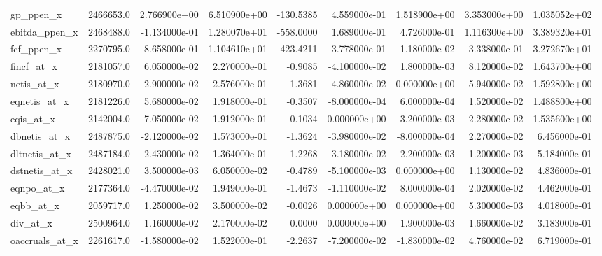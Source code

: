 \documentclass[12pt]{article}
\begin{document}
\begin{landscape}
\begin{longtable}{|l|r|r|r|r|r|r|r|r|}
gp\_ppen\_x               &  2466653.0 &  2.766900e+00 &  6.510900e+00 &   -130.5385 &  4.559000e-01 &  1.518900e+00 &  3.353000e+00 &  1.035052e+02 \\
ebitda\_ppen\_x           &  2468488.0 & -1.134000e-01 &  1.280070e+01 &   -558.0000 &  1.689000e-01 &  4.726000e-01 &  1.116300e+00 &  3.389320e+01 \\
fcf\_ppen\_x              &  2270795.0 & -8.658000e-01 &  1.104610e+01 &   -423.4211 & -3.778000e-01 & -1.180000e-02 &  3.338000e-01 &  3.272670e+01 \\
fincf\_at\_x              &  2181057.0 &  6.050000e-02 &  2.270000e-01 &     -0.9085 & -4.100000e-02 &  1.800000e-03 &  8.120000e-02 &  1.643700e+00 \\
netis\_at\_x              &  2180970.0 &  2.900000e-02 &  2.576000e-01 &     -1.3681 & -4.860000e-02 &  0.000000e+00 &  5.940000e-02 &  1.592800e+00 \\
eqnetis\_at\_x            &  2181226.0 &  5.680000e-02 &  1.918000e-01 &     -0.3507 & -8.000000e-04 &  6.000000e-04 &  1.520000e-02 &  1.488800e+00 \\
eqis\_at\_x               &  2142004.0 &  7.050000e-02 &  1.912000e-01 &     -0.1034 &  0.000000e+00 &  3.200000e-03 &  2.280000e-02 &  1.535600e+00 \\
dbnetis\_at\_x            &  2487875.0 & -2.120000e-02 &  1.573000e-01 &     -1.3624 & -3.980000e-02 & -8.000000e-04 &  2.270000e-02 &  6.456000e-01 \\
dltnetis\_at\_x           &  2487184.0 & -2.430000e-02 &  1.364000e-01 &     -1.2268 & -3.180000e-02 & -2.200000e-03 &  1.200000e-03 &  5.184000e-01 \\
dstnetis\_at\_x           &  2428021.0 &  3.500000e-03 &  6.050000e-02 &     -0.4789 & -5.100000e-03 &  0.000000e+00 &  1.130000e-02 &  4.836000e-01 \\
eqnpo\_at\_x              &  2177364.0 & -4.470000e-02 &  1.949000e-01 &     -1.4673 & -1.110000e-02 &  8.000000e-04 &  2.020000e-02 &  4.462000e-01 \\
eqbb\_at\_x               &  2059717.0 &  1.250000e-02 &  3.500000e-02 &     -0.0026 &  0.000000e+00 &  0.000000e+00 &  5.300000e-03 &  4.018000e-01 \\
div\_at\_x                &  2500964.0 &  1.160000e-02 &  2.170000e-02 &      0.0000 &  0.000000e+00 &  1.900000e-03 &  1.660000e-02 &  3.183000e-01 \\
oaccruals\_at\_x          &  2261617.0 & -1.580000e-02 &  1.522000e-01 &     -2.2637 & -7.200000e-02 & -1.830000e-02 &  4.760000e-02 &  6.719000e-01 \\

\end{longtable}
\end{landscape}
\end{document}
